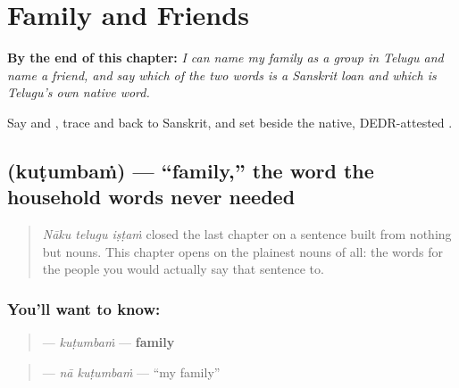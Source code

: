 
\chapter{Family and Friends}
\label{ch:te-family-and-friends}

\begin{chapteropening}
\textbf{By the end of this chapter:} \emph{I can name my family as a group in Telugu and name a friend, and say which of the two words is a Sanskrit loan and which is Telugu's own native word.}

Say    and   , trace  and  back to Sanskrit, and set  beside the native, DEDR-attested .
\end{chapteropening}

\section[\texorpdfstring{\te{కుటుంబం} (kuṭumbaṁ)}{కుటుంబం (kuṭumbaṁ)}]{ (kuṭumbaṁ) — \textquotedblleft{}family,\textquotedblright{} the word the household words never needed}

\label{lesson:TE-C35-kutumbam}



\begin{quote}
\emph{Nāku telugu iṣṭaṁ} closed the last chapter on a sentence built from nothing but nouns. This chapter opens on the plainest nouns of all: the words for the people you would actually say that sentence to.
\end{quote}

\subsection*{You'll want to know: }
\begin{quote}
\textbf{} — \emph{kuṭumbaṁ} — \textbf{family}
\end{quote}

\begin{quote}
\textbf{ } — \emph{nā kuṭumbaṁ} — \textquotedblleft{}my family\textquotedblright{}
\end{quote}

